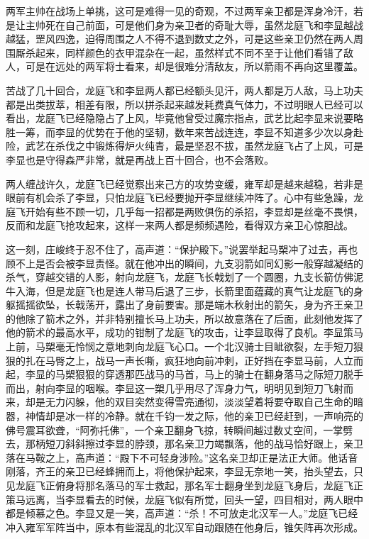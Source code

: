 两军主帅在战场上单挑，这可是难得一见的奇观，不过两军亲卫都是浑身冷汗，若是让主帅死在自己前面，可是他们身为亲卫者的奇耻大辱，虽然龙庭飞和李显越战越猛，罡风四逸，迫得周围之人不得不退到数丈之外，可是这些亲卫仍然在两人周围厮杀起来，同样颜色的衣甲混杂在一起，虽然样式不同不至于让他们看错了敌人，可是在远处的两军将士看来，却是很难分清敌友，所以箭雨不再向这里覆盖。

苦战了几十回合，龙庭飞和李显两人都已经额头见汗，两人都是万人敌，马上功夫都是出类拔萃，相差有限，所以拼杀起来越发耗费真气体力，不过明眼人已经可以看出，龙庭飞已经隐隐占了上风，毕竟他曾受过魔宗指点，武艺比起李显来说要略胜一筹，而李显的优势在于他的坚韧，数年来苦战连连，李显不知道多少次以身赴险，武艺在杀伐之中锻炼得炉火纯青，最是坚忍不拔，虽然龙庭飞占了上风，可是李显也是守得森严非常，就是再战上百十回合，也不会落败。

两人缠战许久，龙庭飞已经觉察出来己方的攻势变缓，雍军却是越来越稳，若非是眼前有机会杀了李显，只怕龙庭飞已经要抛开李显继续冲阵了。心中有些急躁，龙庭飞开始有些不顾一切，几乎每一招都是两败俱伤的杀招，李显却是丝毫不畏惧，反而和龙庭飞抢攻起来，这样一来两人都是频频遇险，看得双方亲卫心惊胆战。

这一刻，庄峻终于忍不住了，高声道：“保护殿下。”说罢举起马槊冲了过去，再也顾不上是否会被李显责怪。就在他冲出的瞬间，九支羽箭如同幻影一般穿越凝结的杀气，穿越交错的人影，射向龙庭飞，龙庭飞长戟划了一个圆圈，九支长箭仿佛泥牛入海，但是龙庭飞也是连人带马后退了三步，长箭里面蕴藏的真气让龙庭飞的身躯摇摇欲坠，长戟荡开，露出了身前要害。那是端木秋射出的箭矢，身为齐王亲卫的他除了箭术之外，并非特别擅长马上功夫，所以故意落在了后面，此刻他发挥了他的箭术的最高水平，成功的钳制了龙庭飞的攻击，让李显取得了良机。李显策马上前，马槊毫无怜悯之意地刺向龙庭飞心口。一个北汉骑士目眦欲裂，左手短刀狠狠的扎在马臀之上，战马一声长嘶，疯狂地向前冲刺，正好挡在李显马前，人立而起，李显的马槊狠狠的穿透那匹战马的马首，马上的骑士在翻身落马之际短刀脱手而出，射向李显的咽喉。李显这一槊几乎用尽了浑身力气，明明见到短刀飞射而来，却是无力闪躲，他的双目突然变得雪亮通彻，淡淡望着将要夺取自己生命的暗器，神情却是冰一样的冷静。就在千钧一发之际，他的亲卫已经赶到，一声响亮的佛号震耳欲聋，“阿弥托佛”，一个亲卫翻身飞掠，转瞬间越过数丈空间，一掌劈去，那柄短刀斜斜擦过李显的脖颈，那名亲卫力竭飘落，他的战马恰好跟上，亲卫落在马鞍之上，高声道：“殿下不可轻身涉险。”这名亲卫却正是法正大师。他话音刚落，齐王的亲卫已经蜂拥而上，将他保护起来，李显无奈地一笑，抬头望去，只见龙庭飞正俯身将那名落马的军士救起，那名军士翻身坐到龙庭飞身后，龙庭飞正策马远离，当李显看去的时候，龙庭飞似有所觉，回头一望，四目相对，两人眼中都是倾慕之色。李显又是一笑，高声道：“杀！不可放走北汉军一人。”龙庭飞已经冲入雍军军阵当中，原本有些混乱的北汉军自动跟随在他身后，锥矢阵再次形成。

